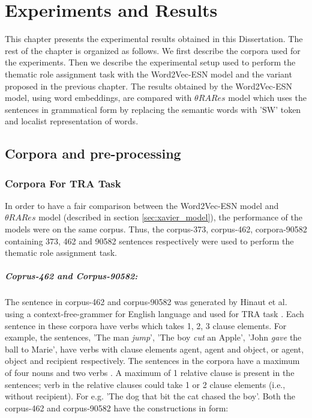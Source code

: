 \chapter{Experiments and Results}\label{results}

This chapter presents the experimental results obtained in this Dissertation. The rest of the chapter is organized as follows. We first describe the corpora used for the experiments. Then we describe the experimental setup used to perform the thematic role assignment task with the Word2Vec-ESN model and the variant proposed in the previous chapter. The results obtained by the Word2Vec-ESN model, using word embeddings, are compared with $\theta RARes$ model which uses the sentences in grammatical form by replacing the semantic words with 'SW' token and localist representation of words.

\section{Corpora and pre-processing}\label{datasets}

\subsection{Corpora For TRA Task}

In order to have a fair comparison between the Word2Vec-ESN model and $\theta RARes$ model (described in section \ref{sec:xavier_model}), the performance of the models were on the  same corpus. Thus, the corpus-373, corpus-462, corpora-90582 containing 373, 462 and 90582 sentences respectively were used to perform the thematic role assignment task.  

\paragraph{Coprus-462 and Corpus-90582: } The sentence in corpus-462 and corpus-90582 was generated by Hinaut et al. using a context-free-grammer for English language and used for TRA task \cite{xavier:2013:RT}. Each sentence in these corpora have verbs which takes 1, 2, 3 clause elements. For example, the sentences, 'The man \textit{jump}', 'The boy \textit{cut} an Apple', 'John \textit{gave} the ball to Marie', have verbs with clause elements agent, agent and object, or agent, object and recipient respectively. The sentences in the corpora have a maximum of four nouns and two verbs \cite{xavier:2013:RT}. A maximum of 1 relative clause is present in the sentences; verb in the relative clauses could take 1 or 2 clause elements (i.e., without recipient). For e.g. 'The dog that bit the cat chased the boy'. Both the corpus-462 and corpus-90582 have the constructions in form:

